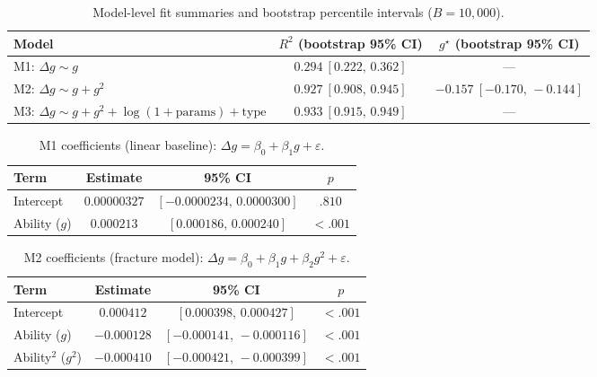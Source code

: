 \documentclass[11pt]{article}
\begin{document}
\begin{table}[H]
\centering
\small
\begin{tabular}{lcc}
\toprule
Model & $R^2$ (bootstrap 95\% CI) & $g^\star$ (bootstrap 95\% CI) \\
\midrule
M1: $\Delta g\sim g$ & $0.294\ [0.222,\,0.362]$ & --- \\
M2: $\Delta g\sim g+g^2$ & $0.927\ [0.908,\,0.945]$ & $-0.157\ [-0.170,\,-0.144]$ \\
M3: $\Delta g\sim g+g^2+\log(1+\mathrm{params})+\mathrm{type}$ & $0.933\ [0.915,\,0.949]$ & --- \\
\bottomrule
\end{tabular}
\caption{Model-level fit summaries and bootstrap percentile intervals ($B=10{,}000$).}
\label{tab:reg_fit_summary}
\end{table}

\begin{table}[H]
\centering
\small
\begin{tabular}{lccc}
\toprule
Term & Estimate & 95\% CI & $p$ \\
\midrule
Intercept & $0.00000327$ & $[-0.0000234,\,0.0000300]$ & $.810$ \\
Ability ($g$) & $0.000213$ & $[0.000186,\,0.000240]$ & $<.001$ \\
\bottomrule
\end{tabular}
\caption{M1 coefficients (linear baseline): $\Delta g=\beta_0+\beta_1 g+\varepsilon$.}
\label{tab:reg_linear}
\end{table}

\begin{table}[H]
\centering
\small
\begin{tabular}{lccc}
\toprule
Term & Estimate & 95\% CI & $p$ \\
\midrule
Intercept & $0.000412$ & $[0.000398,\,0.000427]$ & $<.001$ \\
Ability ($g$) & $-0.000128$ & $[-0.000141,\,-0.000116]$ & $<.001$ \\
Ability$^2$ ($g^2$) & $-0.000410$ & $[-0.000421,\,-0.000399]$ & $<.001$ \\
\bottomrule
\end{tabular}
\caption{M2 coefficients (fracture model): $\Delta g=\beta_0+\beta_1 g+\beta_2 g^2+\varepsilon$.}
\label{tab:reg_quad}
\end{table}
\end{document}
